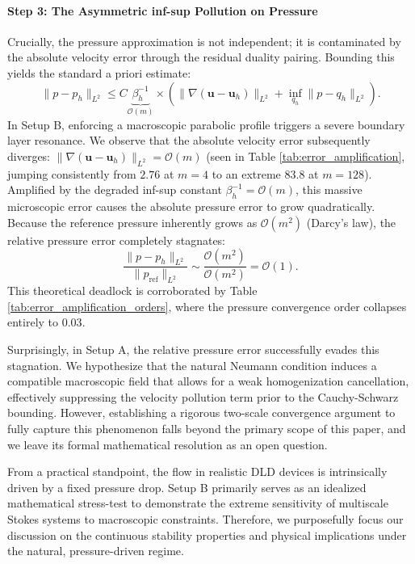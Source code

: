 \documentclass{elsarticle}
\begin{document}
\paragraph{Step 3: The Asymmetric inf-sup Pollution on Pressure}
Crucially, the pressure approximation is not independent; it is contaminated by the absolute velocity error through the residual duality pairing. Bounding this yields the standard {a priori} estimate:
\begin{equation} \label{eq:p_apriori}
    \| p - p_h \|_{L^2} \le C \underbrace{\beta_h^{-1}}_{\mathcal{O}(m)} \times \left( \|\nabla(\mathbf{u} - \mathbf{u}_h)\|_{L^2} + \inf_{q_h} \| p - q_h \|_{L^2} \right).
\end{equation}
In Setup B, enforcing a macroscopic parabolic profile triggers a severe boundary layer resonance. We observe that the absolute velocity error subsequently diverges: $\|\nabla(\mathbf{u} - \mathbf{u}_h)\|_{L^2} = \mathcal{O}(m)$ (seen in Table \ref{tab:error_amplification}, jumping consistently from $2.76$ at $m=4$ to an extreme $83.8$ at $m=128$). Amplified by the degraded inf-sup constant $\beta_h^{-1} = \mathcal{O}(m)$, this massive microscopic error causes the absolute pressure error to grow quadratically. Because the reference pressure inherently grows as $\mathcal{O}(m^2)$ (Darcy's law), the relative pressure error completely stagnates:
\begin{equation} \label{eq:p_stagnation}
    \frac{\| p - p_h \|_{L^2}}{\|p_{\mathrm{ref}}\|_{L^2}} \sim \frac{\mathcal{O}(m^2)}{\mathcal{O}(m^2)} = \mathcal{O}(1).
\end{equation}
This theoretical deadlock is corroborated by Table \ref{tab:error_amplification_orders}, where the pressure convergence order collapses entirely to $0.03$.

Surprisingly, in Setup A, the relative pressure error successfully evades this stagnation. We hypothesize that the natural Neumann condition induces a compatible macroscopic field that allows for a weak homogenization cancellation, effectively suppressing the velocity pollution term prior to the Cauchy-Schwarz bounding. However, establishing a rigorous two-scale convergence argument to fully capture this phenomenon falls beyond the primary scope of this paper, and we leave its formal mathematical resolution as an open question.

From a practical standpoint, the flow in realistic DLD devices is intrinsically driven by a fixed pressure drop. Setup B primarily serves as an idealized mathematical stress-test to demonstrate the extreme sensitivity of multiscale Stokes systems to macroscopic constraints. Therefore, we purposefully focus our discussion on the continuous stability properties and physical implications under the natural, pressure-driven regime.
\end{document}
